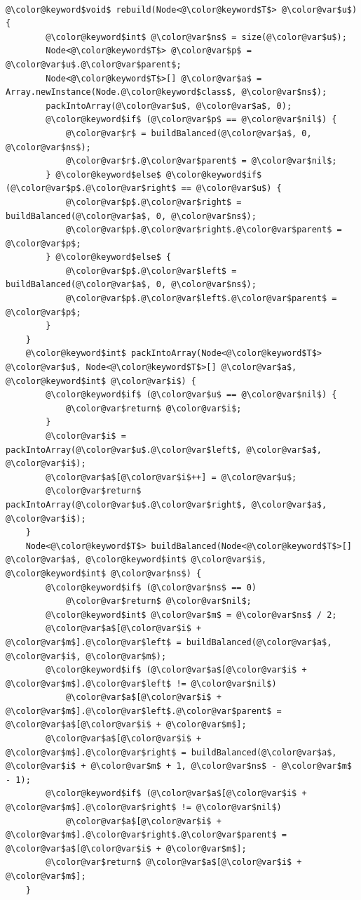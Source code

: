 \documentclass[10pt]{book}
\theoremstyle{plain}
\theoremstyle{definition}
\begin{document}
 \ \vspace{.5ex}\begin{Verbatim}[gobble=1,tabsize=2,frame=single,framerule=1.2pt,commandchars=\\@\$,label=\texttt{ScapegoatTree},labelposition=topline]
	@\color@keyword$void$ rebuild(Node<@\color@keyword$T$> @\color@var$u$) {
		@\color@keyword$int$ @\color@var$ns$ = size(@\color@var$u$);
		Node<@\color@keyword$T$> @\color@var$p$ = @\color@var$u$.@\color@var$parent$;
		Node<@\color@keyword$T$>[] @\color@var$a$ =  Array.newInstance(Node.@\color@keyword$class$, @\color@var$ns$);
		packIntoArray(@\color@var$u$, @\color@var$a$, 0);
		@\color@keyword$if$ (@\color@var$p$ == @\color@var$nil$) {
			@\color@var$r$ = buildBalanced(@\color@var$a$, 0, @\color@var$ns$);
			@\color@var$r$.@\color@var$parent$ = @\color@var$nil$;
		} @\color@keyword$else$ @\color@keyword$if$ (@\color@var$p$.@\color@var$right$ == @\color@var$u$) {
			@\color@var$p$.@\color@var$right$ = buildBalanced(@\color@var$a$, 0, @\color@var$ns$);
			@\color@var$p$.@\color@var$right$.@\color@var$parent$ = @\color@var$p$;
		} @\color@keyword$else$ {
			@\color@var$p$.@\color@var$left$ = buildBalanced(@\color@var$a$, 0, @\color@var$ns$);
			@\color@var$p$.@\color@var$left$.@\color@var$parent$ = @\color@var$p$;
		}
	}
	@\color@keyword$int$ packIntoArray(Node<@\color@keyword$T$> @\color@var$u$, Node<@\color@keyword$T$>[] @\color@var$a$, @\color@keyword$int$ @\color@var$i$) {
		@\color@keyword$if$ (@\color@var$u$ == @\color@var$nil$) {
			@\color@var$return$ @\color@var$i$;
		}
		@\color@var$i$ = packIntoArray(@\color@var$u$.@\color@var$left$, @\color@var$a$, @\color@var$i$);
		@\color@var$a$[@\color@var$i$++] = @\color@var$u$;
		@\color@var$return$ packIntoArray(@\color@var$u$.@\color@var$right$, @\color@var$a$, @\color@var$i$);
	}
	Node<@\color@keyword$T$> buildBalanced(Node<@\color@keyword$T$>[] @\color@var$a$, @\color@keyword$int$ @\color@var$i$, @\color@keyword$int$ @\color@var$ns$) {
		@\color@keyword$if$ (@\color@var$ns$ == 0)
			@\color@var$return$ @\color@var$nil$;
		@\color@keyword$int$ @\color@var$m$ = @\color@var$ns$ / 2;
		@\color@var$a$[@\color@var$i$ + @\color@var$m$].@\color@var$left$ = buildBalanced(@\color@var$a$, @\color@var$i$, @\color@var$m$);
		@\color@keyword$if$ (@\color@var$a$[@\color@var$i$ + @\color@var$m$].@\color@var$left$ != @\color@var$nil$)
			@\color@var$a$[@\color@var$i$ + @\color@var$m$].@\color@var$left$.@\color@var$parent$ = @\color@var$a$[@\color@var$i$ + @\color@var$m$];
		@\color@var$a$[@\color@var$i$ + @\color@var$m$].@\color@var$right$ = buildBalanced(@\color@var$a$, @\color@var$i$ + @\color@var$m$ + 1, @\color@var$ns$ - @\color@var$m$ - 1);
		@\color@keyword$if$ (@\color@var$a$[@\color@var$i$ + @\color@var$m$].@\color@var$right$ != @\color@var$nil$)
			@\color@var$a$[@\color@var$i$ + @\color@var$m$].@\color@var$right$.@\color@var$parent$ = @\color@var$a$[@\color@var$i$ + @\color@var$m$];
		@\color@var$return$ @\color@var$a$[@\color@var$i$ + @\color@var$m$];
	}
\end{Verbatim}
\end{document}
